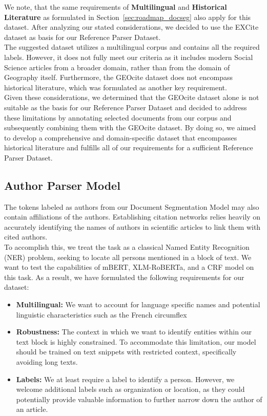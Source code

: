 We note, that the same requirements of \textbf{Multilingual} and \textbf{Historical Literature} as formulated in Section~\ref{sec:roadmap_docseg} also apply for this dataset. After analyzing our stated considerations, we decided to use the EXCite dataset as basis for our Reference Parser Dataset.\\
The suggested dataset utilizes a multilingual corpus and contains all the required labels. However, it does not fully meet our criteria as it includes modern Social Science articles from a broader domain, rather than from the domain of Geography itself. Furthermore, the GEOcite dataset does not encompass historical literature, which was formulated as another key requirement.\\
Given these considerations, we determined that the GEOcite dataset alone is not suitable as the basis for our Reference Parser Dataset and decided to address these limitations by annotating selected documents from our corpus and subsequently combining them with the GEOcite dataset. By doing so, we aimed to develop a comprehensive and domain-specific dataset that encompasses historical literature and fulfills all of our requirements for a sufficient Reference Parser Dataset.

\subsection{Author Parser Model}
The tokens labeled as authors from our Document Segmentation Model may also contain affiliations of the authors. Establishing citation networks relies heavily on accurately identifying the names of authors in scientific articles to link them with cited authors.\\
To accomplish this, we treat the task as a classical Named Entity Recognition (NER) problem, seeking to locate all persons mentioned in a block of text. We want to test the capabilities of mBERT, XLM-RoBERTa, and a CRF model on this task. As a result, we have formulated the following requirements for our dataset:

\begin{itemize}
    \item \textbf{Multilingual:} We want to account for language specific names and potential linguistic characteristics such as the French circumflex
    \item \textbf{Robustness:} The context in which we want to identify entities within our text block is highly constrained. To accommodate this limitation, our model should be trained on text snippets with restricted context, specifically avoiding long texts.
    \item \textbf{Labels:} We at least require a label to identify a person. However, we welcome additional labels such as organization or location, as they could potentially provide valuable information to further narrow down the author of an article.
\end{itemize}

